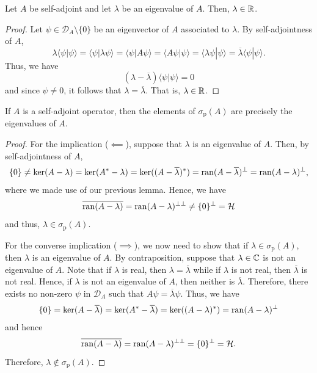 \begin{lemma}
Let $A$ be self-adjoint and let $\lambda$ be an eigenvalue of $A$. Then, $\lambda\in\mathbb{R}$.
\end{lemma}

\begin{proof}
Let $\psi\in\mathcal{D}_A\setminus\{0\}$ be an eigenvector of $A$ associated to $\lambda$. By self-adjointness of $A$,
\begin{equation*}
\lambda \langle \psi|\psi\rangle  =   \langle \psi|\lambda\psi\rangle = \langle \psi|A\psi\rangle = \langle A\psi|\psi\rangle =  \langle\lambda \psi|\psi\rangle= \overline{\lambda} \langle \psi|\psi\rangle.
\end{equation*}
Thus, we have
\begin{equation*}
(\lambda-\overline{\lambda})\langle \psi|\psi\rangle =0 
\end{equation*}
and since $\psi\neq 0$, it follows that $\lambda=\overline{\lambda}$. That is, $\lambda\in\mathbb{R}$. 
\end{proof}

\begin{theorem}
If $A$ is a self-adjoint operator, then the elements of $\sigma_{\mathrm{p}}(A)$ are precisely the eigenvalues of $A$.
\end{theorem}

\begin{proof}
For the implication (\(\impliedby\)), suppose that $\lambda$ is an
eigenvalue of $A$. Then, by self-adjointness of $A$,
\begin{equation*}
\{0\}\neq \ker(A-\lambda)=\ker(A^*-\lambda) = \ker((A-\overline{\lambda})^*) = \operatorname{ran}(A-\overline{\lambda})^{\perp} = \operatorname{ran}(A-\lambda)^{\perp},
\end{equation*}
where we made use of our previous lemma. Hence, we have
\begin{equation*}
\overline{ \operatorname{ran}(A-\lambda)} =  \operatorname{ran}(A-\lambda)^{\perp\perp} \neq \{0\}^{\perp} = \mathcal{H}
\end{equation*}
and thus, $\lambda\in\sigma_{\mathrm{p}}(A)$.

For the converse implication (\(\implies\)), we now need to show that
if $\lambda\in\sigma_{\mathrm{p}}(A)$, then $\lambda$ is an eigenvalue
of $A$. By contraposition, suppose that $\lambda\in\mathbb{C}$ is not an
eigenvalue of $A$. Note that if $\lambda$ is real, then $\lambda =
\overline{\lambda}$ while if $\lambda$ is not real, then
$\overline{\lambda}$ is not real. Hence, if $\lambda$ is not an
eigenvalue of $A$, then neither is $\overline{\lambda}$. Therefore,
there exists no non-zero $\psi$ in $\mathcal{D}_A$ such that
$A\psi=\overline{\lambda}\psi$. Thus, we have
\begin{equation*}
\{0\} = \ker(A-\overline{\lambda})= \ker(A^*-\overline{\lambda})= \ker((A-\lambda)^*) = \operatorname{ran}(A-\lambda)^{\perp}
\end{equation*}
and hence
\begin{equation*}
\overline{\operatorname{ran}(A-\lambda)}=\operatorname{ran}(A-\lambda)^{\perp\perp} = \{0\}^{\perp}=\mathcal{H}.
\end{equation*}
Therefore, $\lambda\notin\sigma_{\mathrm{p}}(A)$.\qedhere
\end{proof}

